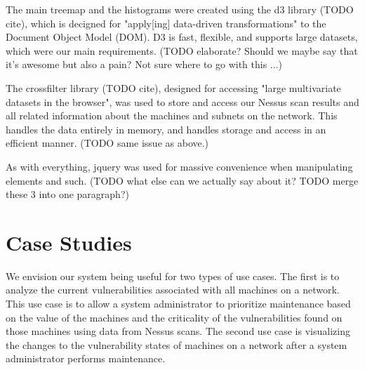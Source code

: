 \documentclass{acm_proc_article-sp}
\begin{document}
The main treemap and the histograms were created using the d3 library (TODO cite), which is decigned for "apply[ing] data-driven transformations" to the Document Object Model (DOM).
 D3 is fast, flexible, and supports large datasets, which were our main requirements.
(TODO elaborate?  Should we maybe say that it's awesome but also a pain?  Not sure where to go with this ...)

The crossfilter library (TODO cite), designed for accessing "large multivariate datasets in the browser", was used to store and access our Nessus scan results and all related information about the machines and subnets on the network.
 This handles the data entirely in memory, and handles storage and access in an efficient manner.
 (TODO same issue as above.)

As with everything, jquery was used for massive convenience when manipulating elements and such.
(TODO what else can we actually say about it?  TODO merge these 3 into one paragraph?)

\section{Case Studies}
We envision our system being useful for two types of use cases. The first is to
analyze the current vulnerabilities associated with all machines on a network.
This use case is to allow a system administrator to prioritize maintenance based
on the value of the machines and the criticality of the vulnerabilities found on
those machines using data from Nessus scans. The second use case is visualizing 
the changes to the vulnerability states of machines on a network after a system
administrator performs maintenance.
\end{document}
